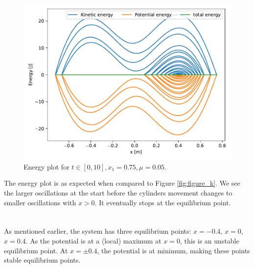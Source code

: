 \documentclass[a4paper,10pt,english]{article}
\begin{document}
\newpage
\section{}
\begin{figure}[h!]
    \centering
    \includegraphics[scale=0.7]{figure_l.pdf}
    \caption{Energy plot for $t\in[0, 10], x_1=0.75, \mu=0.05$.}
    \label{fig:figure_l}
\end{figure}
The energy plot is as expected when compared to Figure \ref{fig:figure_k}. We see the larger oscillations at the start before the cylinders movement changes to smaller oscillations with $x>0$. It eventually stops at the equilibrium point.

\section{}
As mentioned earlier, the system has three equilibrium points: $x=-0.4$, $x=0$, $x=0.4$. As the potential is at a (local) maximum at $x=0$, this is an unstable equilibrium point. At $x=\pm 0.4$, the potential is at minimum, making these points stable equilibrium points. 
\end{document}
